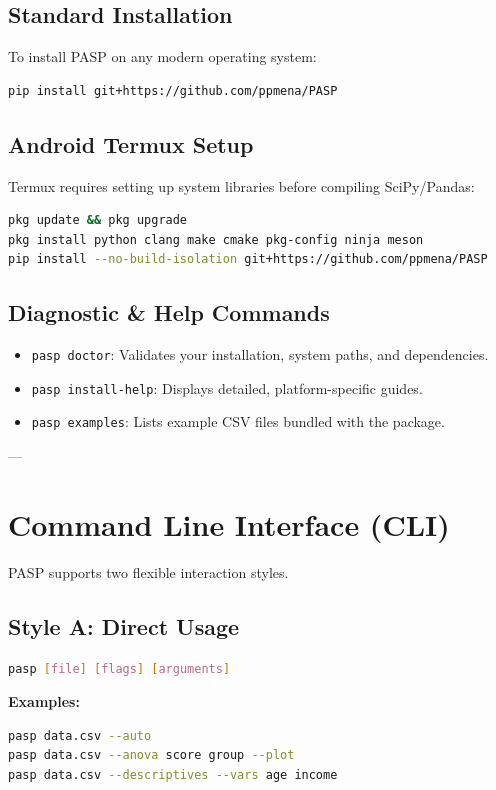 \documentclass[a4paper,11pt,oneside]{article}
\begin{document}
\subsection{Standard Installation}
To install PASP on any modern operating system:
\begin{lstlisting}[language=bash]
pip install git+https://github.com/ppmena/PASP
\end{lstlisting}

\subsection{Android Termux Setup}
Termux requires setting up system libraries before compiling SciPy/Pandas:
\begin{lstlisting}[language=bash]
pkg update && pkg upgrade
pkg install python clang make cmake pkg-config ninja meson
pip install --no-build-isolation git+https://github.com/ppmena/PASP
\end{lstlisting}

\subsection{Diagnostic \& Help Commands}
\begin{itemize}
    \item \texttt{pasp doctor}: Validates your installation, system paths, and dependencies.
    \item \texttt{pasp install-help}: Displays detailed, platform-specific guides.
    \item \texttt{pasp examples}: Lists example CSV files bundled with the package.
\end{itemize}

---

\section{Command Line Interface (CLI)}

PASP supports two flexible interaction styles.

\subsection{Style A: Direct Usage}
\begin{lstlisting}[language=bash]
pasp [file] [flags] [arguments]
\end{lstlisting}
\textbf{Examples:}
\begin{lstlisting}[language=bash]
pasp data.csv --auto
pasp data.csv --anova score group --plot
pasp data.csv --descriptives --vars age income
\end{lstlisting}
\end{document}
